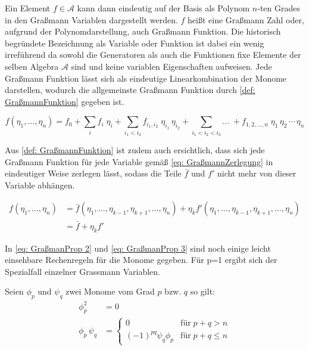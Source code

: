 \noindent  Ein Element $f\in\mathcal A$ kann dann eindeutig auf der Basis als Polynom $n$-ten Grades in den Graßmann Variablen dargestellt werden. $f$ heißt eine Graßmann Zahl oder, aufgrund der Polynomdarstellung, auch Graßmann Funktion. Die historisch begründete Bezeichnung als Variable oder Funktion ist dabei ein wenig irreführend da sowohl die Generatoren als auch die Funktionen fixe Elemente der selben Algebra $\mathcal A$ sind und keine variablen Eigenschaften aufweisen. Jede Graßmann Funktion lässt sich als eindeutige Linearkombination der Monome darstellen, wodurch die allgemeinste Graßmann Funktion durch \eqref{def: GraßmannFunktion} gegeben ist.

\begin{equation} \label{def: GraßmannFunktion}
    f(\eta_1, \dots ,\eta_n) = f_0 + \sum_{i} f_i \;\eta_i + \sum_{i_1<i_2} f_{i_1,i_2} \;\eta_{i_1} \,\eta_{i_2} + \sum_{i_1<i_2<i_3} \dots \;+ f_{1,2,\dots,n} \; \eta_{1}\,\eta_{2}\,\cdots\,\eta_{n}
\end{equation}

\noindent Aus \eqref{def: GraßmannFunktion} ist zudem auch ersichtlich, dass sich jede Graßmann Funktion für jede Variable gemäß \eqref{eq: GraßmannZerlegung} in eindeutiger Weise zerlegen lässt, sodass die Teile $\bar f$ und $f'$ nicht mehr von dieser Variable abhängen. 

\begin{align} 
    f(\eta_1,\dots,\eta_n) &= \bar f(\eta_1,\dots,\eta_{k-1},\eta_{k+1}, \dots ,\eta_n) + \eta_k f'(\eta_1,\dots,\eta_{k-1},\eta_{k+1}, \dots ,\eta_n) \nonumber\\
        & = \bar f + \eta_k f' \label{eq: GraßmannZerlegung}
\end{align}

\noindent In \eqref{eq: GraßmanProp 2} und \eqref{eq: GraßmanProp 3} sind noch einige leicht einsehbare Rechenregeln für die Monome gegeben. Für p=1 ergibt sich der Spezialfall einzelner Grassmann Variablen.

\begin{grayframe}
    Seien $\phi_p$ und $\psi_q$ zwei Monome vom Grad $p$ bzw. $q$ so gilt:
    \begin{align}
        \phi_p^2 &= 0  \label{eq: GraßmanProp 2}\\
        \phi_p \, \psi_q &= \left\{ \begin{array}{ll} 0 & \text{für}\; p+q > n \\ (-1)^{pq} \psi_q \phi_p  & \text{für}\; p+q \leq n\end{array} \right. \label{eq: GraßmanProp 3}
    \end{align}
\end{grayframe}

